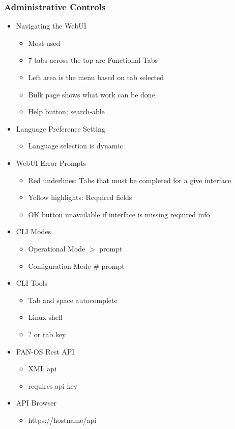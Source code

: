 \subsubsection{Administrative Controls}
    \begin{itemize}
        \item Navigating the WebUI
            \begin{itemize}
                \item Most used
                \item 7 tabs across the top are Functional Tabs
                \item Left area is the menu based on tab selected
                \item Bulk page shows what work can be done
                \item Help button; search-able
            \end{itemize}
        \item Language Preference Setting
            \begin{itemize}
                \item Language selection is dynamic
            \end{itemize}
        \item WebUI Error Prompts
            \begin{itemize}
                \item Red underlines: Tabs that must be completed for a give interface
                \item Yellow highlights: Required fields
                \item OK button unavailable if interface is missing required info
            \end{itemize}
        \item CLI Modes
            \begin{itemize}
                \item Operational Mode $>$ prompt
                \item Configuration Mode $\#$ prompt
            \end{itemize}
        \item CLI Tools
            \begin{itemize}
                \item Tab and space autocomplete
                \item Linux shell
                \item ? or tab key
            \end{itemize}
        \item PAN-OS Rest API
            \begin{itemize}
                \item XML api
                \item requires api key
            \end{itemize}
        \item API Browser
            \begin{itemize}
                \item https://hostname/api
            \end{itemize}
    \end{itemize}
    
